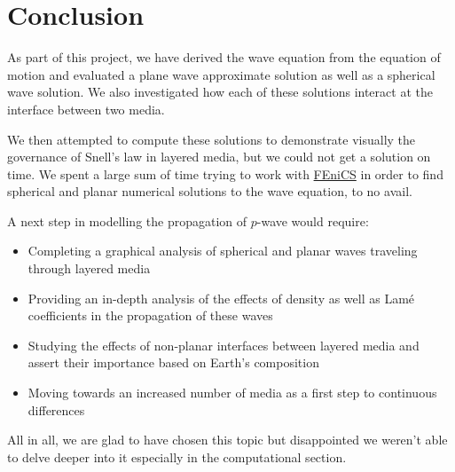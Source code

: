 \chapter{Conclusion}
As part of this project, we have derived the wave equation from the equation of motion and evaluated a plane wave approximate solution as well as a spherical wave solution. We also investigated how each of these solutions interact at the interface between two media.

We then attempted to compute these solutions to demonstrate visually the governance of Snell's law in layered media, but we could not get a solution on time. We spent a large sum of time trying to work with \href{https://fenicsproject.org/}{FEniCS} in order to find spherical and planar numerical solutions to the wave equation, to no avail.

A next step in modelling the propagation of $p$-wave would require:
\begin{itemize}
    \item Completing a graphical analysis of spherical and planar waves traveling through layered media
    \item Providing an in-depth analysis of the effects of density as well as Lamé coefficients in the propagation of these waves
    \item Studying the effects of non-planar interfaces between layered media and assert their importance based on Earth's composition
    \item Moving towards an increased number of media as a first step to continuous differences
\end{itemize}

All in all, we are glad to have chosen this topic but disappointed we weren't able to delve deeper into it especially in the computational section.